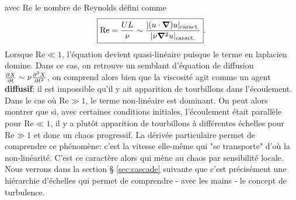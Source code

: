 \documentclass[13pt, a4paper]{extarticle}
\begin{document}
avec Re le nombre de Reynolds défini comme
\begin{align}
    \boxed{\text{Re} = \dfrac{UL}{\nu} \sim \dfrac{|(u\cdot\grad) u|_\text{caract.}}{|\nu\grad^2u|_\text{caract.}}}.
\end{align}
Lorsque $\text{Re}\ll 1$, l'équation devient quasi-linéaire puisque le terme en laplacien domine.
Dans ce cas, on retrouve un semblant d'équation de diffusion $\pdv{X}{t} \sim \nu\pdv[2]{X}{t}$, 
on comprend alors bien que la viscosité 
agit comme un agent {\bf diffusif}; il est impossible qu'il y ait apparition de tourbillons dans
l'écoulement.
Dans le cas où $\text{Re}\gg 1$, le terme non-linéaire est dominant. On peut alors montrer que si, 
avec certaines conditions initiales, l'écoulement était parallèle pour $\text{Re}\ll 1$, il y a 
plutôt apparition de tourbillons à différentes échelles pour $\text{Re}\gg 1$ et donc un chaos 
progressif. La dérivée particulaire permet de comprendre ce phénomène: c'est la vitesse elle-même
qui "se transporte" d'où la non-linéarité.
C'est ce caractère alors qui mène au chaos par sensibilité locale. Nous verrons dans la section \S
\ref{sec:cascade} suivante que c'est précisément une hiérarchie d'échelles qui permet de 
comprendre - avec les mains - le concept de turbulence.
\end{document}
